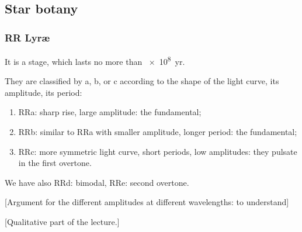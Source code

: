 \documentclass[main.tex]{subfiles}
\begin{document}
\subsection{Star botany}

\subsubsection{RR Lyr\ae}

It is a stage, which lasts no more than \SI{e8}{yr}.

They are classified by a, b, or c according to the shape of the light curve, its amplitude, its period:

\begin{enumerate}
  \item RRa: sharp rise, large amplitude: the fundamental;
  \item RRb: similar to RRa with smaller amplitude, longer period: the fundamental;
  \item RRc: more symmetric light curve, short periods, low amplitudes: they pulsate in the first overtone.
\end{enumerate}

We have also RRd: bimodal, RRe: second overtone.

[Argument for the different amplitudes at different wavelengths: to understand]

[Qualitative part of the lecture.]
\end{document}
